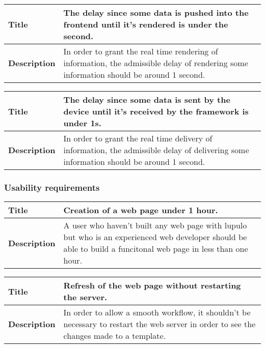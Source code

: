 \documentclass[12pt]{article}
\begin{document}
                \begin{tabularx}{\textwidth}{|l|X|}
                    \hline
                    \textbf{Title} & The delay since some data is pushed into
                    the frontend until it's rendered is under the second. \\
                    \hline
                    \textbf{Description} & In order to grant the real time
                    rendering of information, the admissible delay of rendering
                    some information should be around 1 second.\\
                    \hline
                \end{tabularx}

                \begin{tabularx}{\textwidth}{|l|X|}
                    \hline
                    \textbf{Title} & The delay since some data is sent by the
                    device until it's received by the framework is under 1s. \\
                    \hline
                    \textbf{Description} & In order to grant the real time
                    delivery of information, the admissible delay of delivering
                    some information should be around 1 second. \\
                    \hline
                \end{tabularx}

            \subsubsection{Usability requirements}
                \begin{tabularx}{\textwidth}{|l|X|}
                    \hline
                    \textbf{Title} & Creation of a web page under 1 hour. \\
                    \hline
                    \textbf{Description} & A user who haven't built any web page
                    with lupulo but who is an experienced web developer should
                    be able to build a funcitonal web page in less than one
                    hour. \\
                    \hline
                \end{tabularx}

                \begin{tabularx}{\textwidth}{|l|X|}
                    \hline
                    \textbf{Title} & Refresh of the web page without restarting
                    the server. \\
                    \hline
                    \textbf{Description} & In order to allow a smooth workflow,
                    it shouldn't be necessary to restart the web server in order
                    to see the changes made to a template. \\
                    \hline
                \end{tabularx}
\end{document}
